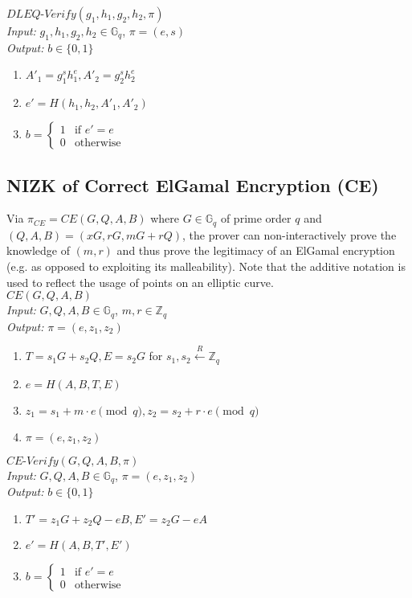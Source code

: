 \documentclass[letterpaper,twocolumn,10pt]{article}
\theoremstyle{definition}
\theoremstyle{remark}
\begin{document}
\noindent\underline{$DLEQ\text{-}Verify(g_1, h_1, g_2, h_2, \pi)$}\\
\textit{Input:} $g_1, h_1, g_2, h_2 \in \mathbb{G}_q$, $\pi = (e, s)$\\
\textit{Output:} $b \in \{0, 1\}$
\begin{enumerate}
\item $A'_1 = g_1^s h_1^e, A'_2 = g_2^s h_2^e$
\item $e' = H(h_1, h_2, A'_1, A'_2)$
\item $b = \begin{cases}
1 & \text{if $e' = e$}\\
0 & \text{otherwise}
\end{cases}$
\end{enumerate}

\subsection{NIZK of Correct ElGamal Encryption (CE)}
Via $\pi_{CE} = CE(G, Q, A, B)$ \cite{cherniaeva2019homomorphic} where $G \in \mathbb{G}_q$ of prime order $q$ and $(Q, A, B) = (x G, r G, m G + r Q)$, the prover can non-interactively prove the knowledge of $(m, r)$ and thus prove the legitimacy of an ElGamal encryption (e.g. as opposed to exploiting its malleability). Note that the additive notation is used to reflect the usage of points on an elliptic curve.\\

\noindent\underline{$CE(G, Q, A, B)$}\\
\textit{Input:} $G, Q, A, B \in \mathbb{G}_q$, $m, r \in \mathbb{Z}_q$\\
\textit{Output:} $\pi = (e, z_1, z_2)$
\begin{enumerate}
\item $T = s_1 G + s_2 Q, E = s_2 G$ for $s_1, s_2 \xleftarrow{R} \mathbb{Z}_q$
\item $e = H(A, B, T, E)$
\item $z_1 = s_1 + m \cdot e \pmod q, z_2 = s_2 + r \cdot e \pmod q$
\item $\pi = (e, z_1, z_2)$
\end{enumerate}

\noindent\underline{$CE\text{-}Verify(G, Q, A, B, \pi)$}\\
\textit{Input:} $G, Q, A, B \in \mathbb{G}_q$, $\pi = (e, z_1, z_2)$\\
\textit{Output:} $b \in \{0, 1\}$
\begin{enumerate}
\item $T' = z_1 G + z_2 Q - e B, E' = z_2 G - e A$
\item $e' = H(A, B, T', E')$
\item $b = \begin{cases}
1 & \text{if $e' = e$}\\
0 & \text{otherwise}
\end{cases}$
\end{enumerate}
\end{document}
